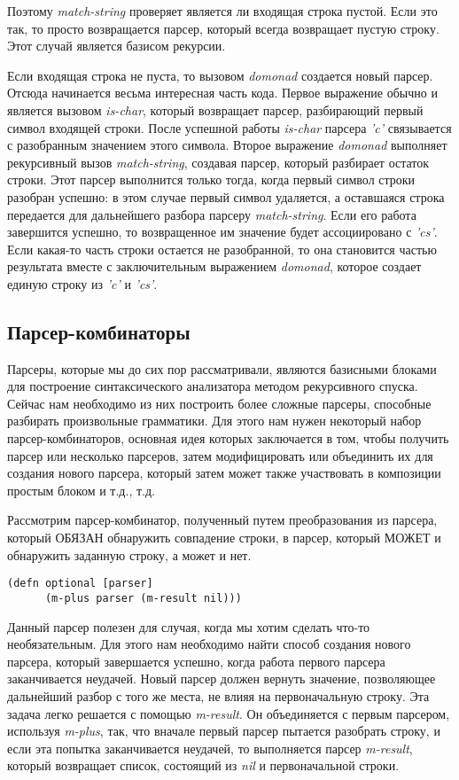 \documentclass[a4paper,12pt]{article}
\newcommand{\cl}[1] {{\it #1}}
\begin{document}
Поэтому  \cl{match-string} проверяет является ли входящая строка пустой. Если это так, то
просто возвращается парсер, который всегда возвращает пустую строку. Этот случай является
базисом рекурсии.

Если входящая строка не пуста, то вызовом \cl{domonad} создается новый парсер. Отсюда начинается весьма 
интересная часть кода. Первое выражение обычно и является вызовом \cl{is-char}, который возвращает
парсер, разбирающий первый символ входящей строки. После успешной работы \cl{is-char} парсера
\cl{'c'} связывается с разобранным значением этого символа. Второе выражение \cl{domonad} выполняет рекурсивный вызов
\cl{match-string}, создавая парсер, который разбирает остаток строки. Этот парсер выполнится только тогда,
когда первый символ строки разобран успешно: в этом случае первый символ удаляется, а оставшаяся
строка передается для дальнейшего разбора парсеру \cl{match-string}. Если его работа завершится успешно, то 
возвращенное им значение будет ассоциировано с \cl{'cs'}. Если какая-то часть строки остается не разобранной, то
она становится частью результата вместе с заключительным выражением \cl{domonad}, которое создает единую 
строку из \cl{'c'} и \cl{'cs'}. 


\subsection{Парсер-комбинаторы}\label{parser-combinators}
Парсеры, которые мы до сих пор рассматривали, являются базисными блоками для построение
синтаксического анализатора методом рекурсивного спуска. Сейчас нам необходимо
из них построить более сложные парсеры, способные разбирать произвольные грамматики. 
Для этого нам нужен некоторый набор парсер-комбинаторов, основная идея которых 
заключается в том, чтобы получить парсер или несколько парсеров, затем модифицировать или объединить 
их для создания нового парсера, который затем может также участвовать в композиции простым блоком 
и т.д., т.д.

Рассмотрим парсер-комбинатор, полученный путем преобразования из парсера, который ОБЯЗАН обнаружить
совпадение строки, в парсер, который МОЖЕТ и обнаружить заданную строку, а может и нет. 

\begin{verbatim}
(defn optional [parser]
      (m-plus parser (m-result nil)))
\end{verbatim}

Данный парсер полезен для случая, когда мы хотим сделать что-то необязательным. Для этого нам необходимо
найти способ создания нового парсера, который завершается успешно, когда работа первого парсера
заканчивается неудачей. Новый парсер должен вернуть значение, позволяющее дальнейший разбор с того же
места, не влияя на первоначальную строку. Эта задача легко решается с помощью \cl{m-result}. Он объединяется
с первым парсером, используя \cl{m-plus}, так, что вначале первый парсер пытается разобрать
строку, и если эта попытка заканчивается неудачей, то выполняется парсер \cl{m-result}, который возвращает
список, состоящий из \cl{nil} и первоначальной строки. 
\end{document}
